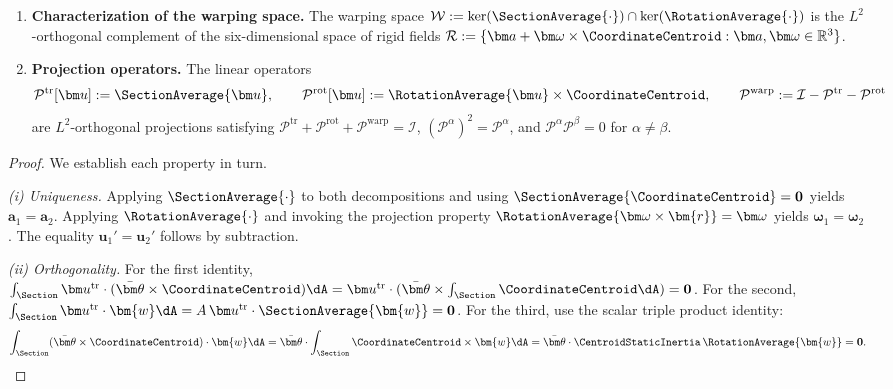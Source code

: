 \begin{Details}
\begin{proposition}
\begin{enumerate}[label=(\roman*)]
    \item \textbf{Characterization of the warping space.} The warping space $\mathcal{W} := \ker(\SectionAverage{\cdot}) \cap \ker(\RotationAverage{\cdot})$ is the $L^2$-orthogonal complement of the six-dimensional space of rigid fields $\mathcal{R} := \{\bm a + \bm\omega \times \CoordinateCentroid : \bm a, \bm\omega \in \mathbb{R}^3\}$.

    \item \textbf{Projection operators.} The linear operators
    \begin{equation*}
        \mathcal{P}^{\mathrm{tr}}[\bm u] := \SectionAverage{\bm u},
        \qquad
        \mathcal{P}^{\mathrm{rot}}[\bm u] := \RotationAverage{\bm u} \times \CoordinateCentroid,
        \qquad
        \mathcal{P}^{\mathrm{warp}} := \mathcal{I} - \mathcal{P}^{\mathrm{tr}} - \mathcal{P}^{\mathrm{rot}}
    \end{equation*}
    are $L^2$-orthogonal projections satisfying $\mathcal{P}^{\mathrm{tr}} + \mathcal{P}^{\mathrm{rot}} + \mathcal{P}^{\mathrm{warp}} = \mathcal{I}$, $(\mathcal{P}^{\alpha})^2 = \mathcal{P}^{\alpha}$, and $\mathcal{P}^{\alpha}\mathcal{P}^{\beta} = 0$ for $\alpha \neq \beta$.
\end{enumerate}
\end{proposition}

\begin{proof}
We establish each property in turn.

\textit{(i) Uniqueness.} 
Applying $\SectionAverage{\cdot}$ to both decompositions and using $\SectionAverage{\CoordinateCentroid} = \mathbf{0}$ yields $\bm a_1 = \bm a_2$. Applying $\RotationAverage{\cdot}$ and invoking the projection property $\RotationAverage{\bm\omega \times \bm{r}} = \bm\omega$ yields $\bm\omega_1 = \bm\omega_2$. The equality $\bm u_1' = \bm u_2'$ follows by subtraction.

\textit{(ii) Orthogonality.} 
For the first identity, $\int_{\Section} \bm u^{\mathrm{tr}} \cdot (\bar{\bm\theta} \times \CoordinateCentroid) \dA = \bm u^{\mathrm{tr}} \cdot (\bar{\bm\theta} \times \int_{\Section} \CoordinateCentroid \dA) = \mathbf{0}$. 
For the second, $\int_{\Section} \bm u^{\mathrm{tr}} \cdot \bm{w} \dA = A\, \bm u^{\mathrm{tr}} \cdot \SectionAverage{\bm{w}} = \mathbf{0}$. 
For the third, use the scalar triple product identity:
\begin{equation*}
    \int_{\Section} (\bar{\bm\theta} \times \CoordinateCentroid) \cdot \bm{w} \dA 
    = \bar{\bm\theta} \cdot \int_{\Section} \CoordinateCentroid \times \bm{w} \dA 
    = \bar{\bm\theta} \cdot \CentroidStaticInertia \, \RotationAverage{\bm{w}} = \mathbf{0}.
\end{equation*}


\end{proof}
\end{Details}
